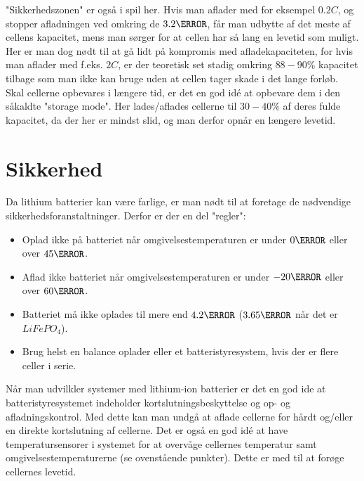 "Sikkerhedszonen" \space er også i spil her. Hvis man aflader med for eksempel $0.2C$, og stopper afladningen ved omkring de $3.2\volt$, får man udbytte af det meste af cellens kapacitet, mens man sørger for at cellen har så lang en levetid som muligt. Her er man dog nødt til at gå lidt på kompromis med afladekapaciteten, for hvis man aflader med f.eks. $2C$, er der teoretisk set stadig omkring $88-90\percent$ kapacitet tilbage som man ikke kan bruge uden at cellen tager skade i det lange forløb. \\

Skal cellerne opbevares i længere tid, er det en god idé at opbevare dem i den såkaldte "storage mode". Her lades/aflades cellerne til $30-40\percent$ af deres fulde kapacitet, da der her er mindst slid, og man derfor opnår en længere levetid. 

\section{Sikkerhed}
Da lithium batterier kan være farlige, er man nødt til at foretage de nødvendige sikkerhedsforanstaltninger. Derfor er der en del "regler":

\begin{itemize}[noitemsep]
\item Oplad ikke på batteriet når omgivelsestemperaturen er under $0\degreeCelsius$ eller over $45\degreeCelsius$. 
\item Aflad ikke batteriet når omgivelsestemperaturen er under $-20\degreeCelsius$ eller over $60\degreeCelsius$.
\item Batteriet må ikke oplades til mere end $4.2\volt$ ($3.65\volt$ når det er $LiFePO_4$).
\item Brug helst en balance oplader eller et batteristyresystem, hvis der er flere celler i serie.
\end{itemize}

Når man udvilkler systemer med lithium-ion batterier er det en god ide at batteristyresystemet indeholder kortslutningsbeskyttelse og op- og afladningskontrol. Med dette kan man undgå at aflade cellerne for hårdt og/eller en direkte kortslutning af cellerne. Det er også en god idé at have temperatursensorer i systemet for at overvåge cellernes temperatur samt omgivelsestemperaturerne (se ovenstående punkter). Dette er med til at forøge cellernes levetid. 

